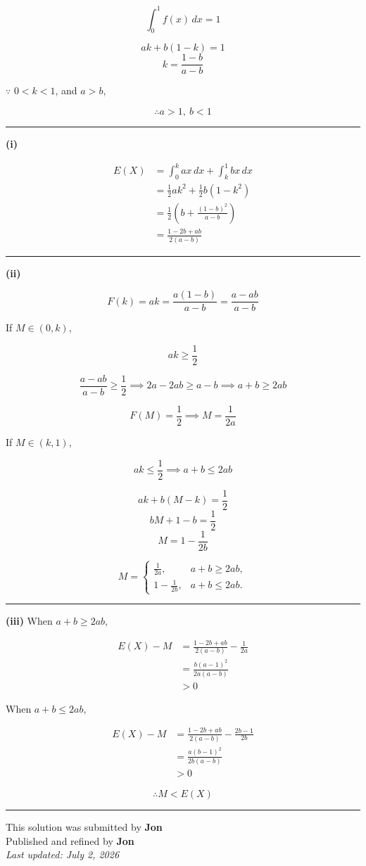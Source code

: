 \documentclass[12pt]{article}
\begin{document}
\newcommand{\ds}{\displaystyle}
$$\int_{0}^{1} f(x)\, dx=1$$

$$ak+b(1-k)=1$$
$$k=\frac{1-b}{a-b}$$

$\because $ $0<k<1$, and $a>b$,

$$\therefore a>1,\  b<1$$

\bigskip\hrule\bigskip

\textbf{(i)}

\begin{align*}
E(X)
&=\int_0^k ax\,dx+\int_k^1 bx\,dx\\
&=\frac12ak^2+\frac12b(1-k^2)\\
&=\frac12\left(b+\frac{(1-b)^2}{a-b}\right)\\
&=\frac{1-2b+ab}{2(a-b)}
\end{align*}

\bigskip\hrule\bigskip

\textbf{(ii)}

$$F(k)=ak=\frac{a(1-b)}{a-b}=\frac{a-ab}{a-b}$$

If $\ds M\in(0,k)$,

$$ak\geq \frac12$$

$$\frac{a-ab}{a-b}\geq \frac12\implies 2a-2ab\geq a-b\implies a+b\geq 2ab$$

$$F(M)=\frac12\implies M=\frac1{2a}$$

If $\ds M\in(k,1)$,

$$ak\leq \frac12\implies a+b\leq 2ab$$

$$ak+b(M-k)=\frac12$$
$$bM+1-b=\frac12$$
$$M=1-\frac1{2b}$$


$$
M=\begin{cases}
\ds \frac1{2a}, & a+b\geq 2ab,\\[8pt]
\ds 1-\frac1{2b}, & a+b\leq 2ab.
\end{cases}
$$

\bigskip\hrule\bigskip

\textbf{(iii)} When $\ds a+b\geq 2ab$,

\begin{align*}
E(X)-M
&=\frac{1-2b+ab}{2(a-b)}-\frac1{2a}\\
&=\frac{b(a-1)^2}{2a(a-b)}\\
&>0
\end{align*}

When $\ds a+b\leq 2ab$,

\begin{align*}
E(X)-M
&=\frac{1-2b+ab}{2(a-b)}-\frac{2b-1}{2b}\\
&=\frac{a(b-1)^2}{2b(a-b)}\\
&>0
\end{align*}

$$\therefore M<E(X)$$

\bigskip
\hrule
\begin{center}
    This solution was submitted by \textbf{Jon}\\[4pt]
    Published and refined by \textbf{Jon}\\[8pt]
    \textit{Last updated: July 2, 2026}
\end{center}
\end{document}
